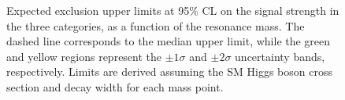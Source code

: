 \begin{figure}[!htb]
\centering
{}
\caption{Expected exclusion upper limits at 95\% CL on the signal strength in the three categories, as a function of the resonance mass. The dashed line corresponds to the median upper limit, while the green and yellow regions represent the $\pm 1\sigma$ and $\pm 2 \sigma$ uncertainty bands, respectively. Limits are derived assuming the SM Higgs boson cross section and decay width for each mass point.}\label{fig:13TeVexplim}
\end{figure}


